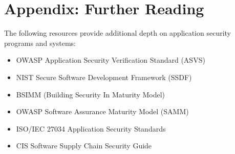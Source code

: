 \documentclass[11pt,letterpaper]{article}
\begin{document}
\section{Appendix: Further Reading}

The following resources provide additional depth on application security programs and systems:

\begin{itemize}[leftmargin=2em]
    \item OWASP Application Security Verification Standard (ASVS)
    \item NIST Secure Software Development Framework (SSDF)
    \item BSIMM (Building Security In Maturity Model)
    \item OWASP Software Assurance Maturity Model (SAMM)
    \item ISO/IEC 27034 Application Security Standards
    \item CIS Software Supply Chain Security Guide
\end{itemize}
\end{document}
